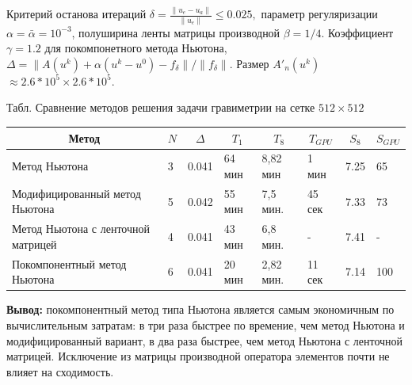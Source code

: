\documentclass[10pt,pdf, mathserif, hyperref={unicode}]{beamer}
\begin{document}
\begin{frame}
	Критерий останова итераций 
	$\delta=\frac{\|u_e-u_a\|}{\|u_e\|}\leqslant 0.025,$ параметр регуляризации $\alpha=\bar{\alpha}=10^{-3}$, полуширина ленты матрицы производной $\beta=1/4$. Коэффициент $\gamma=1.2$ для покомпонетного метода Ньютона, $\Delta=\|A(u^k)+\alpha(u^k-u^0)-f_\delta\|/\|f_\delta\|$. Размер $A'_n(u^k)$  $\approx 2.6*10^5\times2.6*10^5$.
	
	\begin{table}[]
		\centering
		\renewcommand{\arraystretch}{1.5}
		\scriptsize{Табл. Сравнение методов решения задачи гравиметрии на сетке $512\times512$}
		\label{table3.1}
		\begin{tabular}{|p{}|l|l|l|l|l|l|l|}
			\hline
			\multicolumn{1}{|c|}{Метод}        & \multicolumn{1}{c|}{$N$} &
			\multicolumn{1}{c|}{$\Delta$} & \multicolumn{1}{c|}{$T_1$} & \multicolumn{1}{c|}{$T_8$} &
			\multicolumn{1}{c|}{$T_{GPU}$} &
			\multicolumn{1}{c|}{$S_8$} & \multicolumn{1}{c|}{$S_{GPU}$}
			\\ \hline
			Метод Ньютона                      &  3        & 0.041                          &       64 мин                  &     8,82 мин &
			1 мин & 7.25 & 65 \\ \hline
			Модифицированный метод Ньютона     &         5           & 0.042            & 55 мин                  & 7,5 мин.    &
			45 сек & 7.33 & 73             \\ \hline
			Метод Ньютона с ленточной матрицей &  4               & 0.041                    & 43 мин                  & 6,8 мин. & -   & 7.41 & -            \\ \hline
			\rowcolor{Green}
			Покомпонентный метод Ньютона &  6               & 0.041                    & 20 мин  & 2,82 мин.  &  11 сек   & 7.14 & 100            \\ \hline
		\end{tabular}
	\end{table}
	\textbf{\color{blue}Вывод:} покомпонентный метод типа Ньютона является самым экономичным по вычислительным затратам: в три раза быстрее по времение, чем метод Ньютона и модифицированный вариант, в два раза быстрее, чем метод Ньютона с ленточной матрицей. Исключение из матрицы производной оператора элементов почти не влияет на сходимость. 
\end{frame}
\end{document}
